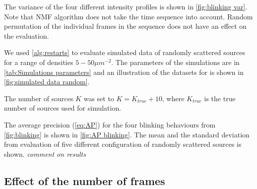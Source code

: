 The variance of the four different intensity profiles is shown in \autoref{fig:blinking var}. Note that NMF algorithm does not take the time sequence into account. Random permutation of the individual frames in the sequence does not have an effect on the evaluation.

We used \autoref{alg:restarts} to evaluate simulated data of randomly scattered sources for a range of densities $5-50\unit{\mu m^{-2}}$. The parameters of the simulations are in \autoref{tab:Simulations parameters} and an illustration of the datasets for is shown  in \autoref{fig:simulated data random}. 

The number of sources $K$ was set to $K=K_{true}+10$, where $K_{true}$ is the true number of sources used for simulation. 


The average precision (\autoref{eq:AP}) for the four blinking behaviours from \autoref{fig:blinking} is shown in \autoref{fig:AP blinking}. The mean and the standard deviation from evaluation of five different configuration of randomly scattered sources is shown. 
\fix
\emph{comment on results}


\subsection{Effect of the number of frames\label{sub:results - number of frames}}
%

